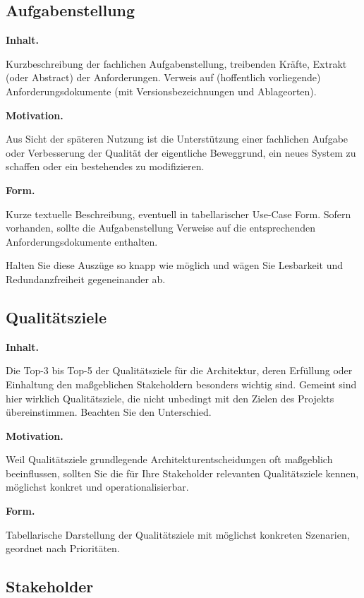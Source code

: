 \documentclass[]{article}
\begin{document}
\hypertarget{_aufgabenstellung}{%
\subsection{Aufgabenstellung}\label{_aufgabenstellung}}

\textbf{Inhalt.}

Kurzbeschreibung der fachlichen Aufgabenstellung, treibenden Kräfte,
Extrakt (oder Abstract) der Anforderungen. Verweis auf (hoffentlich
vorliegende) Anforderungsdokumente (mit Versionsbezeichnungen und
Ablageorten).

\textbf{Motivation.}

Aus Sicht der späteren Nutzung ist die Unterstützung einer fachlichen
Aufgabe oder Verbesserung der Qualität der eigentliche Beweggrund, ein
neues System zu schaffen oder ein bestehendes zu modifizieren.

\textbf{Form.}

Kurze textuelle Beschreibung, eventuell in tabellarischer Use-Case Form.
Sofern vorhanden, sollte die Aufgabenstellung Verweise auf die
entsprechenden Anforderungsdokumente enthalten.

Halten Sie diese Auszüge so knapp wie möglich und wägen Sie Lesbarkeit
und Redundanzfreiheit gegeneinander ab.

\hypertarget{_qualit_tsziele}{%
\subsection{Qualitätsziele}\label{_qualit_tsziele}}

\textbf{Inhalt.}

Die Top-3 bis Top-5 der Qualitätsziele für die Architektur, deren
Erfüllung oder Einhaltung den maßgeblichen Stakeholdern besonders
wichtig sind. Gemeint sind hier wirklich Qualitätsziele, die nicht
unbedingt mit den Zielen des Projekts übereinstimmen. Beachten Sie den
Unterschied.

\textbf{Motivation.}

Weil Qualitätsziele grundlegende Architekturentscheidungen oft
maßgeblich beeinflussen, sollten Sie die für Ihre Stakeholder relevanten
Qualitätsziele kennen, möglichst konkret und operationalisierbar.

\textbf{Form.}

Tabellarische Darstellung der Qualitätsziele mit möglichst konkreten
Szenarien, geordnet nach Prioritäten.

\hypertarget{_stakeholder}{%
\subsection{Stakeholder}\label{_stakeholder}}
\end{document}
